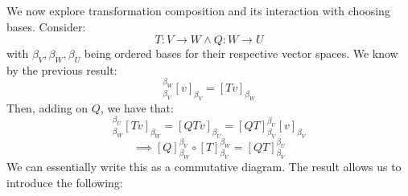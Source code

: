 \documentclass[10pt,letterpaper]{article} %
\begin{document}
We now explore transformation composition and its interaction with choosing bases. Consider:
\begin{equation*}
T: V \xrightarrow{} W \land Q: W \xrightarrow{} U
\end{equation*}
with $\beta_V, \beta_W, \beta_U$ being ordered bases for their respective vector spaces. We know by the previous result:
\begin{equation*}
[T]_{\beta_V}^{\beta_W}[v]_{\beta_V} = [Tv]_{\beta_W}
\end{equation*}
Then, adding on $Q$, we have that:
\begin{equation*}
[Q]_{\beta_W}^{\beta_U}[Tv]_{\beta_W} = [QTv]_{\beta_U} = [QT]_{\beta_V}^{\beta_U}[v]_{\beta_V}
\end{equation*}
\begin{equation*}
\implies [Q]_{\beta_W}^{\beta_V} \circ [T]_{\beta_V}^{\beta_W} = [QT]_{\beta_V}^{\beta_U}
\end{equation*}
We can essentially write this as a commutative diagram. The result allows us to introduce the following:
\end{document}
